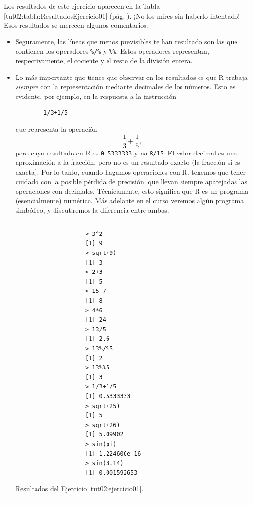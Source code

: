 \documentclass[10pt,a4paper]{article}\usepackage[]{graphicx}\usepackage[]{color}
\newcounter {cont01}
\begin{document}
Los resultados de este ejercicio aparecen en la Tabla \ref{tut02:tabla:ResultadosEjercicio01} (pág. \pageref{tut02:tabla:ResultadosEjercicio01}). ¡No los mires sin haberlo intentado! Esos resultados se merecen algunos comentarios:
\begin{itemize}
  \item Seguramente, las líneas que menos previsibles te han resultado son las que contienen los operadores \verb#%/%# y \verb#%%#.
        Estos operadores representan, respectivamente, el cociente y el resto de la división entera.
  \item Lo más importante que tienes que observar en los resultados es que R trabaja {\em
        siempre} con la representación mediante decimales de los números. Esto es evidente, por ejemplo, en la respuesta a la instrucción
        \begin{verbatim}
        1/3+1/5
        \end{verbatim}
        que representa la operación
        \[\dfrac{1}{3}+\dfrac{1}{5},\]
        pero cuyo resultado en R es {\tt 0.5333333} y no {\tt 8/15}. El valor decimal es una aproximación a la fracción, pero no es un resultado exacto (la fracción sí es exacta). Por lo tanto, cuando hagamos operaciones con R, tenemos que tener cuidado con la posible pérdida de precisión, que llevan siempre aparejadas las operaciones con decimales. Técnicamente, esto significa que R es un programa (esencialmente) {\sf numérico}. Más adelante en el curso veremos algún programa {\sf simbólico}, y discutiremos la diferencia entre ambos.
        \begin{table}[t!]
\hrule
\quad
\begin{verbatim}
                    > 3^2
                    [1] 9
                    > sqrt(9)
                    [1] 3
                    > 2+3
                    [1] 5
                    > 15-7
                    [1] 8
                    > 4*6
                    [1] 24
                    > 13/5
                    [1] 2.6
                    > 13%/%5
                    [1] 2
                    > 13%%5
                    [1] 3
                    > 1/3+1/5
                    [1] 0.5333333
                    > sqrt(25)
                    [1] 5
                    > sqrt(26)
                    [1] 5.09902
                    > sin(pi)
                    [1] 1.224606e-16
                    > sin(3.14)
                    [1] 0.001592653
\end{verbatim}
\caption{Resultados del Ejercicio \ref{tut02:ejercicio01}.}
\label{tut02:tabla:ResultadosEjercicio01}
\hrule
\end{table}


\end{itemize}
\end{document}
